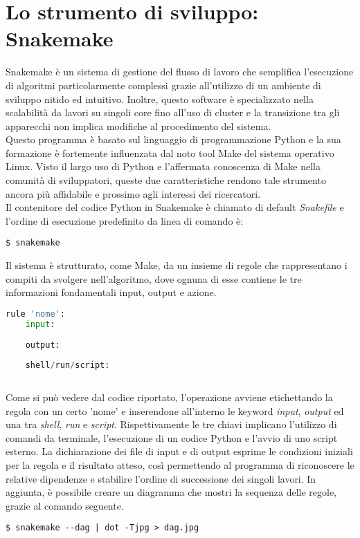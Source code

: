 \section{Lo strumento di sviluppo: Snakemake}
Snakemake è un sistema di gestione del flusso di lavoro che semplifica l'esecuzione di algoritmi particolarmente complessi grazie all'utilizzo di un ambiente di sviluppo nitido ed intuitivo. Inoltre, questo software è specializzato nella scalabilità da lavori su singoli core fino all'uso di cluster e la transizione tra gli apparecchi non implica modifiche al procedimento del sistema. \\
Questo programma è basato sul linguaggio di programmazione Python e la sua formazione è fortemente influenzata dal noto tool Make del sistema operativo Linux. Visto il largo uso di Python e l'affermata conoscenza di Make nella comunità di sviluppatori, queste due caratteristiche rendono tale strumento ancora più affidabile e prossimo agli interessi dei ricercatori. \\
Il contenitore del codice Python in Snakemake è chiamato di default \textit{Snakefile} e l'ordine di esecuzione predefinito da linea di comando è: 
\begin{lstlisting}
$ snakemake
\end{lstlisting}
Il sistema è strutturato, come Make, da un insieme di regole che rappresentano i compiti da svolgere nell'algoritmo, dove ognuna di esse contiene le tre informazioni fondamentali input, output e azione.
\begin{lstlisting}[language=Python]
rule 'nome':
	input:
	
	output:
	
	shell/run/script:
	
\end{lstlisting}
Come si può vedere dal codice riportato, l'operazione avviene etichettando la regola con un certo 'nome' e inserendone all'interno le keyword \textit{input}, \textit{output} ed una tra \textit{shell}, \textit{run} e \textit{script}. Rispettivamente le tre chiavi implicano l'utilizzo di comandi da terminale, l'esecuzione di un codice Python e l'avvio di uno script esterno. La dichiarazione dei file di input e di output esprime le condizioni iniziali per la regola e il risultato atteso, così permettendo al programma di riconoscere le relative dipendenze e stabilire l'ordine di successione dei singoli lavori. In aggiunta, è possibile creare un diagramma che mostri la sequenza delle regole, grazie al comando seguente.
\begin{lstlisting}
$ snakemake --dag | dot -Tjpg > dag.jpg
\end{lstlisting}
 
